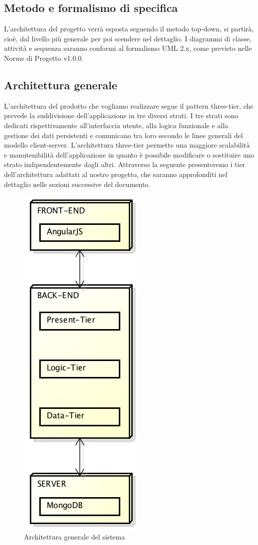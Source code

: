 \subsection{Metodo e formalismo di specifica}
L'architettura del progetto verrà esposta seguendo il metodo top-down, si partirà, cioè, dal livello più generale per poi scendere nel dettaglio. I diagrammi di classe, attività e sequenza saranno conformi al formalismo UML 2.x, come previsto nelle Norme di Progetto v1.0.0.

\subsection{Architettura generale}
L'architettura del prodotto che vogliamo realizzare segue il pattern three-tier, che prevede la suddivisione dell'applicazione in tre diversi strati. I tre strati sono dedicati rispettivamente all'interfaccia utente, alla logica funzionale e alla gestione dei dati persistenti e comunicano tra loro secondo le linee generali del modello client-server. L'architettura three-tier permette una maggiore scalabilità e manutenibilità dell'applicazione in quanto è possibile modificare o sostituire uno strato indipendentemente dagli altri. Attraverso la seguente presenteremo i tier dell'architettura adattati al nostro progetto, che saranno approfonditi nel dettaglio nelle sezioni successive del documento.

\begin{figure}[h]
	\centering
	\includegraphics[height=0.6\textheight]{img/architettura_generale}
	\caption[Architettura generale del sistema]{Architettura generale del sistema}
\end{figure}

